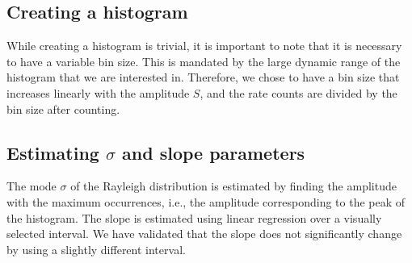 \documentclass[useAMS,usenatbib]{mn2e}
\begin{document}
\subsection{Creating a histogram} \label{sec:histogram}
While creating a histogram is trivial, it is important to note that it is necessary to have a variable bin size. This is mandated by the large dynamic range of the histogram that we are interested in. Therefore, we chose to have a bin size that increases linearly with the amplitude $S$, and the rate counts are divided by the bin size after counting. %

\subsection{Estimating $\sigma$ and slope parameters}
The mode $\sigma$ of the Rayleigh distribution is estimated by finding the amplitude with the maximum occurrences, i.e., the amplitude corresponding to the peak of the histogram. The slope is estimated using linear regression over a visually selected interval. We have validated that the slope does not significantly change by using a slightly different interval.
\end{document}
